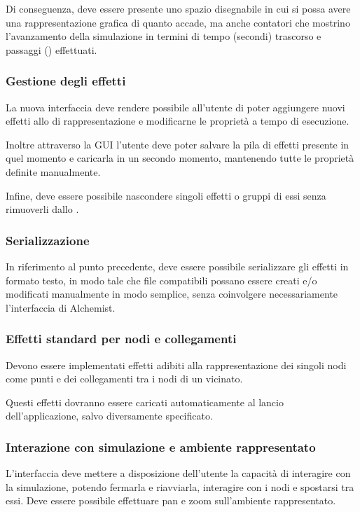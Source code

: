                 Di conseguenza, deve essere presente uno spazio disegnabile in cui si possa avere una rappresentazione grafica di quanto accade, ma anche contatori che mostrino l'avanzamento della simulazione in termini di tempo (secondi) trascorso e passaggi () effettuati.

            \subsubsection{Gestione degli effetti}\label{subusub:manageEffects}
                La nuova interfaccia deve rendere possibile all'utente di poter aggiungere nuovi effetti allo  di rappresentazione e modificarne le proprietà a tempo di esecuzione.

                Inoltre attraverso la GUI l'utente deve poter salvare la pila di effetti presente in quel momento e caricarla in un secondo momento, mantenendo tutte le proprietà definite manualmente.

                Infine, deve essere possibile nascondere singoli effetti o gruppi di essi senza rimuoverli dallo .

            \subsubsection{Serializzazione }
                In riferimento al punto precedente, deve essere possibile serializzare gli effetti in formato testo, in modo tale che file compatibili possano essere creati e/o modificati manualmente in modo semplice, senza coinvolgere necessariamente l'interfaccia di Alchemist.

            \subsubsection{Effetti standard per nodi e collegamenti}\label{subusub:defaultEffects}
                Devono essere implementati effetti adibiti alla rappresentazione dei singoli nodi come punti e dei collegamenti tra i nodi di un vicinato.

                Questi effetti dovranno essere caricati automaticamente al lancio dell'applicazione, salvo diversamente specificato.

            \subsubsection{Interazione con simulazione e ambiente rappresentato}\label{subsub:interazione}
                L'interfaccia deve mettere a disposizione dell'utente la capacità di interagire con la simulazione, potendo fermarla e riavviarla, interagire con i nodi e spostarsi tra essi. Deve essere possibile effettuare pan e zoom sull'ambiente rappresentato.


